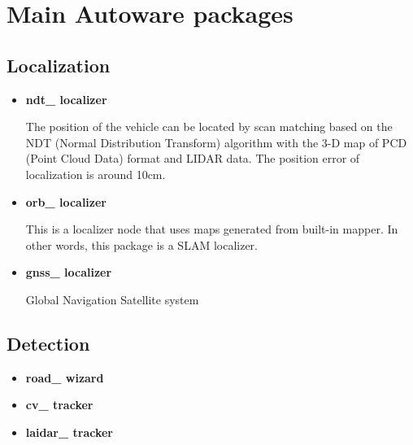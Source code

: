 \documentclass[
10pt, %
a4paper, %
oneside, %
BCOR5mm, %
]{scrartcl}
\begin{document}





\newpage %


\section*{Main Autoware packages }
\subsection*{Localization}
\begin{itemize}

\item \textbf{ndt\_ localizer }

The position of the vehicle can be located by scan matching based on the NDT (Normal Distribution Transform) algorithm with the 3-D map of PCD (Point Cloud Data) format and LIDAR data. The position error of localization is around 10cm. 

\item \textbf{orb\_ localizer }

This is a localizer node that uses maps generated from built-in mapper. In other words, this package is a SLAM localizer. 


\item \textbf{gnss\_ localizer}

Global Navigation Satellite system 

\end{itemize}
 

\subsection*{Detection}
\begin{itemize}
\item \textbf{road\_ wizard }

\item \textbf{cv\_ tracker }

\item \textbf{laidar\_ tracker }

\end{itemize}
\end{document}
